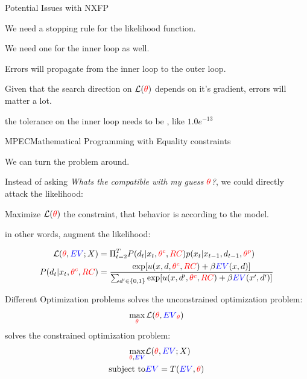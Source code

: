 \documentclass[english]{beamer}
\begin{document}
\begin{frame}{Potential Issues with NXFP}
\begin{midi}
\item We need a stopping rule for the likelihood function.
\item We need one for the inner loop as well.
\item Errors will propagate from the inner loop to the outer loop.
\item Given that the search direction on $\mathcal{L}({\color{red}{\theta}})$ depends on it's gradient, errors will matter a lot.
\item the tolerance on the inner loop needs to be , like $1.0e^{-13}$
\end{midi}
\end{frame}




\begin{frame}{MPEC}{Mathematical Programming with Equality constraints}

\begin{midi}
\item We can turn the problem around. 
\item Instead of asking \emph{Whats the  compatible with my guess ${\color{red}{\theta}}$?}, we could directly attack the likelihood: 
\item Maximize $\mathcal{L}({\color{red}{\theta}})$  the constraint, that behavior is  according to the model.
\item in other words, augment the likelihood:
\end{midi}

\begin{align*}
\mathcal{L}({\color{red}{\theta}},{\color{blue}{EV}};X) &= \Pi_{t=2}^T P(d_t|x_t,{\color{red}{\theta^c}},{\color{red}{RC}})p(x_t|x_{t-1},d_{t-1},{\color{red}{\theta^p}}) \\
P(d_t|x_t,{\color{red}{\theta^c}},{\color{red}{RC}}) &= \frac{\exp[u(x,d,{\color{red}{\theta^c}},{\color{red}{RC}}) + \beta{\color{blue}{EV}}(x,d)]}{\sum_{d'\in\{0,1\}}\exp[u(x,d',{\color{red}{\theta^c}},{\color{red}{RC}}) + \beta{\color{blue}{EV}}(x',d')]}
\end{align*}

\end{frame}

\begin{frame}{Different Optimization problems}
 solves the unconstrained optimization problem:
\begin{equation*}
\max_{{\color{red}{\theta}}} \mathcal{L}({\color{red}{\theta}},{\color{blue}{EV}}_{\color{red}{\theta}})
\end{equation*}
 solves the constrained optimization problem:
\begin{align*}
\max_{{\color{red}{\theta}},{\color{blue}{EV}}} & \mathcal{L}({\color{red}{\theta}},{\color{blue}{EV}};X) \\
\text{subject to} & {\color{blue}{EV}} = T({\color{blue}{EV}},{\color{red}{\theta}})
\end{align*}
\end{frame}
\end{document}
